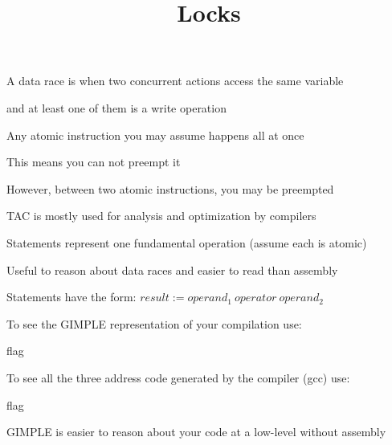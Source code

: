 

\title{Locks}


  \begin{frame}
    \titlepage
  \end{frame}

  \begin{slide}


    A data race is when two concurrent actions access the same variable

    and at least one of them is a write operation

  \end{slide}

  \begin{slide}


    Any atomic instruction you may assume happens all at once
    \medskip

    This means you can not preempt it
    \medskip

    However, between two atomic instructions, you may be preempted

  \end{slide}

  \begin{slide}


    TAC is mostly used for analysis and optimization by compilers
    \medskip

    Statements represent one fundamental operation (assume each is atomic)

    \leftspace{}Useful to reason about data races and easier to read than assembly
    \medskip

    Statements have the form: $result := operand_1\:operator\:operand_2$

  \end{slide}

  \begin{slide}


    To see the GIMPLE representation of your compilation use:

     flag
    \medskip

    To see all the three address code generated by the compiler (gcc) use:

     flag
    \medskip

    GIMPLE is easier to reason about your code at a low-level without assembly

  \end{slide}

